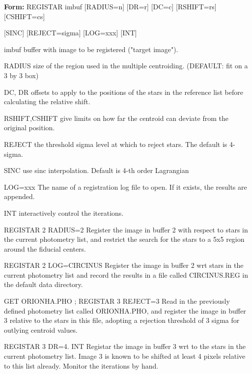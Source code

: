 {\newpage\clearpage
{}%
\begin{command}
  \item[\textbf{Form: } REGISTAR imbuf {[RADIUS=n]} {[DR=r]} {[DC=c]} 
       {[RSHIFT=rs]} {[CSHIFT=cs]}\hfill]{}
       \item{{[SINC]} {[REJECT=sigma]} {[LOG=xxx]} {[INT]}}
  \item[imbuf]{buffer with image to be registered ("target image").}
  \item[RADIUS]{size of the region used in the multiple centroiding.
       (DEFAULT: fit on a 3 by 3 box)}
  \item[DC, DR]{offsets to apply to the positions of the stars in the
       reference list before calculating the relative shift.}
  \item[RSHIFT,CSHIFT]{give limits on how far the centroid can deviate 
       from the original position.}
  \item[REJECT]{the threshold sigma level at which to reject stars. The
       default is 4-sigma.}
  \item[SINC]{use sinc interpolation. Default is 4-th order Lagrangian}
  \item[LOG=xxx]{The name of a registration log file to open.  If it exists,
       the results are appended.  }
  \item[INT]{interactively control the iterations.}
\end{command}%
\lthtmlfigureZ
\lthtmlcheckvsize\clearpage}

{\newpage\clearpage
{}%
\begin{example}
  \item[REGISTAR 2 RADIUS=2\hfill]{Register the image in buffer 2 with
       respect to stars in the current photometry list, and restrict the
       search for the stars to a 5x5 region around the fiducial centers.}
\par
\item[REGISTAR 2 LOG=CIRCINUS \hfill]{Register the image in buffer 2 wrt
       stars in the current photometry list and record the results in a
       file called CIRCINUS.REG in the default data directory.}
\par
\item[GET ORIONHA.PHO ; REGISTAR 3 REJECT=3\hfill]{ Read in the
       previously defined photometry list called ORIONHA.PHO, and register
       the image in buffer 3 relative to the stars in this file, adopting a
       rejection threshold of 3 sigma for outlying centroid values.}
\par
\item[REGISTAR 3 DR=4. INT\hfill]{Registar the image in buffer 3 wrt to
       the stars in the current photometry list.  Image 3 is known to be
       shifted at least 4 pixels relative to this list already.  Monitor
       the iterations by hand.}
\end{example}%
\lthtmlfigureZ
\lthtmlcheckvsize\clearpage}

